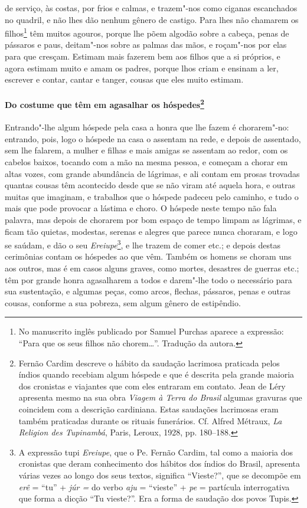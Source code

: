de serviço, às costas, por frios e calmas, e trazem"-nos como ciganas
escanchados no quadril, e não lhes dão nenhum gênero de castigo. Para
lhes não chamarem os filhos\footnote{ No manuscrito inglês publicado
por Samuel Purchas aparece a expressão: ``Para que os seus filhos não
chorem\ldots{}''. Tradução da autora.} têm muitos agouros, porque lhe põem
algodão sobre a cabeça, penas de pássaros e paus, deitam"-nos sobre as
palmas das mãos, e roçam"-nos por elas para que cresçam. Estimam mais
fazerem bem aos filhos que a si próprios, e agora estimam muito e amam
os padres, porque lhos criam e ensinam a ler, escrever e contar, cantar
e tanger, cousas que eles muito estimam.

\paragraph[Do costume que têm em agasalhar os hóspedes]{Do costume que têm em 
agasalhar os hóspedes\protect\footnote{ Fernão Cardim descreve o hábito da
saudação lacrimosa praticada pelos índios quando recebiam algum
hóspede e que é descrita pela grande maioria dos cronistas e viajantes
que com eles entraram em contato. Jean de Léry apresenta mesmo na
sua obra \textit{Viagem à Terra do Brasil} algumas gravuras que
coincidem com a descrição cardiniana. Estas saudações lacrimosas eram
também praticadas durante os rituais funerários. Cf. Alfred Métraux,
\textit{La Religion des Tupinambá}, Paris, Leroux, 1928, pp. 180--188.}}

Entrando"-lhe algum hóspede pela casa a honra que lhe fazem é
chorarem"-no: entrando, pois, logo o hóspede na casa o assentam na rede,
e depois de assentado, sem lhe falarem, a mulher e filhas e mais
amigas se assentam ao redor, com os cabelos baixos, tocando com a mão
na mesma pessoa, e começam a chorar em altas vozes, com grande
abundância de lágrimas, e ali contam em prosas trovadas quantas cousas
têm acontecido desde que se não viram até aquela hora, e outras muitas
que imaginam, e trabalhos que o hóspede padeceu pelo caminho, e tudo o
mais que pode provocar a lástima e choro. O hóspede neste tempo não
fala palavra, mas depois de chorarem por bom espaço de tempo limpam as
lágrimas, e ficam tão quietas, modestas, serenas e alegres que parece
nunca choraram, e logo se saúdam, e dão o seu 
\textit{Ereiupe}\footnote{ A expressão tupi \textit{Ereiupe}, que o Pe. Fernão
Cardim, tal como a maioria dos cronistas que deram conhecimento dos
hábitos dos índios do Brasil, apresenta várias vezes ao longo dos seus
textos, significa ``Vieste?'', que se decompõe em \textit{erê} = ``tu'' +
\textit{júr =} do verbo \textit{aju} = ``vieste'' + \textit{pe} =
partícula interrogativa que forma a dicção ``Tu vieste?''. Era a forma
de saudação dos povos Tupis.}, e lhe trazem de comer etc.; e
depois destas cerimônias contam os hóspedes ao que vêm. Também os
homens se choram uns aos outros, mas é em casos alguns graves, como
mortes, desastres de guerras etc.; têm por grande honra agasalharem a
todos e darem"-lhe todo o necessário para sua sustentação, e algumas
peças, como arcos, flechas, pássaros, penas e outras cousas, conforme a
sua pobreza, sem algum gênero de estipêndio.

